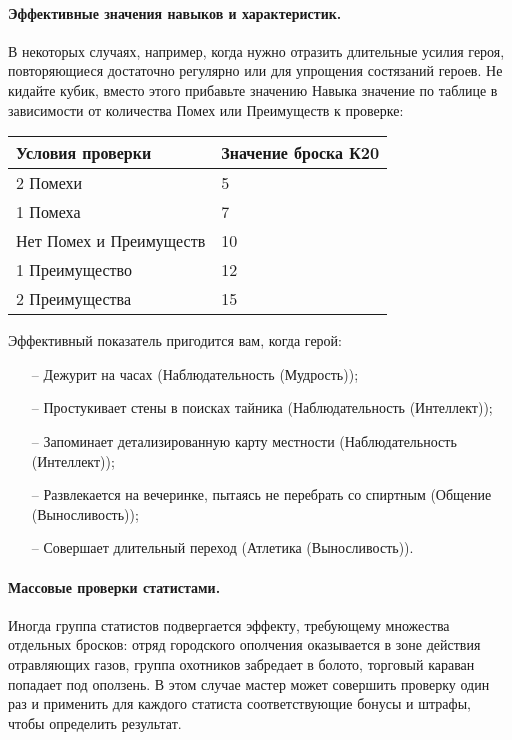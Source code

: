 \paragraph{Эффективные значения навыков и характеристик.} В некоторых случаях, например, когда нужно отразить длительные усилия героя, повторяющиеся достаточно регулярно или для упрощения состязаний героев. Не кидайте кубик, вместо этого прибавьте значению Навыка значение по таблице в зависимости от количества Помех или Преимуществ к проверке:
\begin{center}
\begin{tabular}{|l|l|}
\hline
Условия проверки & Значение броска К20 \\ \hline
2 Помехи & 5 \\ \hline
1 Помеха & 7 \\ \hline
Нет Помех и Преимуществ & 10 \\ \hline
1 Преимущество & 12 \\ \hline
2 Преимущества & 15 \\ \hline
\end{tabular}
\end{center}
Эффективный показатель пригодится вам, когда герой:
\begin{itemize}
    \item[--] Дежурит на часах (Наблюдательность (Мудрость));
    \item[--] Простукивает стены в поисках тайника (Наблюдательность (Интеллект));
    \item[--] Запоминает детализированную карту местности (Наблюдательность (Интеллект));
    \item[--] Развлекается на вечеринке, пытаясь не перебрать со спиртным (Общение (Выносливость));
    \item[--] Совершает длительный переход (Атлетика (Выносливость)).
\end{itemize}

\paragraph{Массовые проверки статистами.} 
Иногда группа статистов подвергается эффекту, требующему множества отдельных бросков: отряд городского ополчения оказывается в зоне действия отравляющих газов, группа охотников забредает в болото, торговый караван попадает под оползень. В этом случае мастер может совершить проверку один раз и применить для каждого статиста соответствующие бонусы и штрафы, чтобы определить результат.
